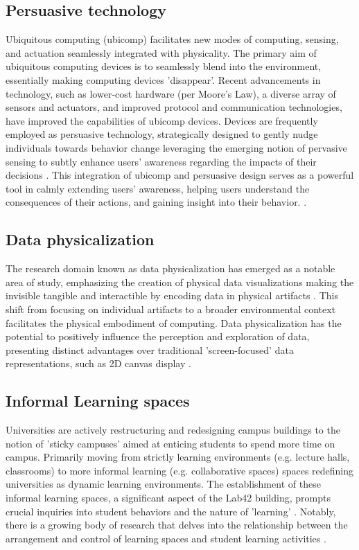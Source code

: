 \subsection{Persuasive technology}

Ubiquitous computing (ubicomp) facilitates new modes of computing, sensing, and actuation seamlessly integrated with physicality. The primary aim of ubiquitous computing devices is to seamlessly blend into the environment, essentially making computing devices 'disappear'\cite{weiser}. Recent advancements in technology, such as lower-cost hardware (per Moore's Law), a diverse array of sensors and actuators, and improved protocol and communication technologies, have improved the capabilities of ubicomp devices. Devices are frequently employed as persuasive technology, strategically designed to gently nudge individuals towards behavior change leveraging the emerging notion of pervasive sensing to subtly enhance users' awareness regarding the impacts of their decisions  \cite{twinkly}. This integration of ubicomp and persuasive design serves as a powerful tool in calmly extending users' awareness, helping users understand the consequences of their actions, and gaining insight into their behavior. \cite{calm}.

\subsection{Data physicalization}

The research domain known as data physicalization has emerged as a notable area of study, emphasizing the creation of physical data visualizations making the invisible tangible and interactible by encoding data in physical artifacts \cite{tangible}. This shift from focusing on individual artifacts to a broader environmental context facilitates the physical embodiment of computing. Data physicalization has the potential to positively influence the perception and exploration of data, presenting distinct advantages over traditional 'screen-focused' data representations, such as 2D canvas display \cite{physicalization}.

\subsection{Informal Learning spaces}

Universities are actively restructuring and redesigning campus buildings to the notion of 'sticky campuses' \cite{sticky} aimed at enticing students to spend more time on campus. Primarily moving from strictly learning environments (e.g. lecture halls, classrooms) to more informal learning (e.g. collaborative spaces) spaces redefining universities as dynamic learning environments. The establishment of these informal learning spaces, a significant aspect of the Lab42 building, prompts crucial inquiries into student behaviors and the nature of 'learning' \cite{critical}. Notably, there is a growing body of research that delves into the relationship between the arrangement and control of learning spaces and student learning activities \cite{learning}. 

\newpage